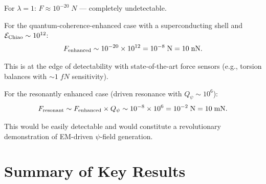 \documentclass[aps,prd,twocolumn,superscriptaddress,floatfix,nofootinbib]{revtex4-2}
\newcommand{\lam}{\lambda}
\begin{document}
For $\lam = 1$: $F \approx 10^{-20}\;\si{N}$ --- completely
undetectable.

For the quantum-coherence-enhanced case with a superconducting shell
and $\mathcal{E}_{\rm Chiao} \sim 10^{12}$:
\begin{equation}
F_{\rm enhanced} \sim 10^{-20} \times 10^{12}
= 10^{-8}\;\si{N} = 10\;\si{nN}.
\end{equation}

This is at the edge of detectability with state-of-the-art force
sensors (e.g., torsion balances with $\sim 1\;\si{fN}$ sensitivity).

For the resonantly enhanced case (driven resonance with
$Q_\psi \sim 10^6$):
\begin{equation}
F_{\rm resonant} \sim F_{\rm enhanced} \times Q_\psi
\sim 10^{-8} \times 10^{6} = 10^{-2}\;\si{N} = 10\;\si{mN}.
\end{equation}

This would be easily detectable and would constitute a revolutionary
demonstration of EM-driven $\psi$-field generation.


\section{Summary of Key Results}\label{sec:summary}
\end{document}
